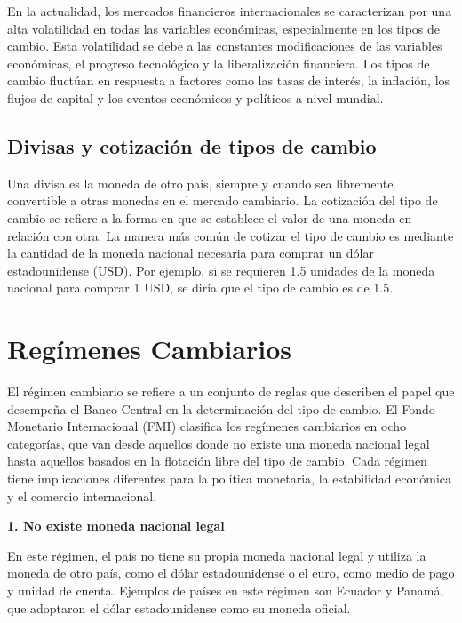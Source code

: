 \documentclass[
  jou,
  floatsintext,
  longtable,
  a4paper,
  nolmodern,
  notxfonts,
  notimes,
  12pt,
  colorlinks=true,linkcolor=blue,citecolor=blue,urlcolor=blue]{apa7}
\begin{document}
En la actualidad, los mercados financieros internacionales se
caracterizan por una alta volatilidad en todas las variables económicas,
especialmente en los tipos de cambio. Esta volatilidad se debe a las
constantes modificaciones de las variables económicas, el progreso
tecnológico y la liberalización financiera. Los tipos de cambio fluctúan
en respuesta a factores como las tasas de interés, la inflación, los
flujos de capital y los eventos económicos y políticos a nivel mundial.

\subsection{Divisas y cotización de tipos de
cambio}\label{divisas-y-cotizaciuxf3n-de-tipos-de-cambio}

Una divisa es la moneda de otro país, siempre y cuando sea libremente
convertible a otras monedas en el mercado cambiario. La cotización del
tipo de cambio se refiere a la forma en que se establece el valor de una
moneda en relación con otra. La manera más común de cotizar el tipo de
cambio es mediante la cantidad de la moneda nacional necesaria para
comprar un dólar estadounidense (USD). Por ejemplo, si se requieren 1.5
unidades de la moneda nacional para comprar 1 USD, se diría que el tipo
de cambio es de 1.5.

\section{Regímenes Cambiarios}\label{reguxedmenes-cambiarios}

El régimen cambiario se refiere a un conjunto de reglas que describen el
papel que desempeña el Banco Central en la determinación del tipo de
cambio. El Fondo Monetario Internacional (FMI) clasifica los regímenes
cambiarios en ocho categorías, que van desde aquellos donde no existe
una moneda nacional legal hasta aquellos basados en la flotación libre
del tipo de cambio. Cada régimen tiene implicaciones diferentes para la
política monetaria, la estabilidad económica y el comercio
internacional.

\textbf{1. No existe moneda nacional legal}

En este régimen, el país no tiene su propia moneda nacional legal y
utiliza la moneda de otro país, como el dólar estadounidense o el euro,
como medio de pago y unidad de cuenta. Ejemplos de países en este
régimen son Ecuador y Panamá, que adoptaron el dólar estadounidense como
su moneda oficial.
\end{document}
